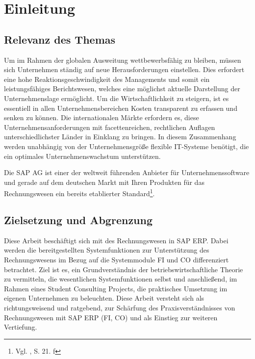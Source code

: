 \section{Einleitung}
\subsection{Relevanz des Themas}
Um im Rahmen der globalen Ausweitung wettbewerbsfähig zu bleiben, müssen sich Unternehmen ständig auf neue Herausforderungen einstellen. Dies erfordert eine hohe Reaktionsgeschwindigkeit des Managements und somit ein leistungsfähiges Berichtswesen, welches eine möglichst aktuelle Darstellung der Unternehmenslage ermöglicht. Um die Wirtschaftlichkeit zu steigern, ist es essentiell in allen Unternehmensbereichen Kosten transparent zu erfassen und senken zu können. 
Die internationalen Märkte erfordern es, diese Unternehmensanforderungen mit facettenreichen, rechtlichen Auflagen unterschiedlichster Länder in Einklang zu bringen. 
In diesem Zusammenhang werden unabhängig von der Unternehmensgröße flexible IT-Systeme benötigt, die ein optimales Unternehmenswachstum unterstützen.

Die SAP AG ist einer der weltweit führenden Anbieter für Unternehmenssoftware und gerade auf dem deutschen Markt mit Ihren Produkten für das Rechnungswesen ein bereits etablierter Standard\footnote{Vgl. \cite{Patel2009}, S. 21. f}.

\subsection{Zielsetzung und Abgrenzung}
Diese Arbeit beschäftigt sich mit des Rechnungswesen in SAP ERP. Dabei werden die bereitgestellten Systemfunktionen zur Unterstützung des Rechnungswesens im Bezug auf die Systemmodule FI und CO differenziert betrachtet.
Ziel ist es, ein Grundverständnis der betriebswirtschaftliche Theorie zu vermitteln, die wesentlichen Systemfunktionen selbst und anschließend, im Rahmen eines Student Consulting Projects, die praktisches Umsetzung im eigenen Unternehmen zu beleuchten. Diese Arbeit versteht sich als richtungsweisend und ratgebend, zur Schärfung des Praxisverständnisses von Rechnungswesen mit SAP ERP (FI, CO) und als Einstieg zur weiteren Vertiefung.



